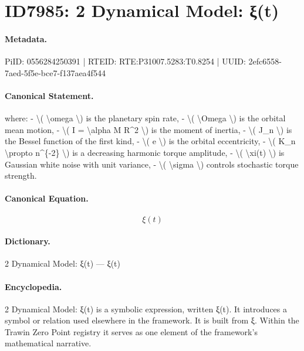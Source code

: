 \section*{ID7985: 2 Dynamical Model: ξ(t)}
\paragraph{Metadata.}
PiID: 0556284250391 | RTEID: RTE:P31007.5283:T0.8254 | UUID: 2efc6558-7aed-5f5e-bce7-f137aea4f544

\paragraph{Canonical Statement.}
where: - \textbackslash{}( \textbackslash{}omega \textbackslash{}) is the planetary spin rate, - \textbackslash{}( \textbackslash{}Omega \textbackslash{}) is the orbital mean motion, - \textbackslash{}( I = \textbackslash{}alpha M R\textasciicircum{}2 \textbackslash{}) is the moment of inertia, - \textbackslash{}( J\_n \textbackslash{}) is the Bessel function of the first kind, - \textbackslash{}( e \textbackslash{}) is the orbital eccentricity, - \textbackslash{}( K\_n \textbackslash{}propto n\textasciicircum{}\{-2\} \textbackslash{}) is a decreasing harmonic torque amplitude, - \textbackslash{}( \textbackslash{}xi(t) \textbackslash{}) is Gaussian white noise with unit variance, - \textbackslash{}( \textbackslash{}sigma \textbackslash{}) controls stochastic torque strength.

\paragraph{Canonical Equation.}
\[
\xi(t)
\]

\paragraph{Dictionary.}
2 Dynamical Model: ξ(t) — ξ(t)

\paragraph{Encyclopedia.}
2 Dynamical Model: ξ(t) is a symbolic expression, written ξ(t). It introduces a symbol or relation used elsewhere in the framework. It is built from ξ. Within the Trawin Zero Point registry it serves as one element of the framework's mathematical narrative.
